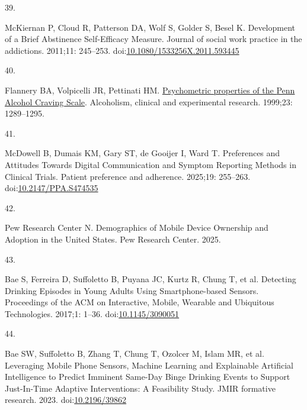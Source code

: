 \documentclass[
  letterpaper,
  DIV=11,
  numbers=noendperiod]{scrartcl}
\newlength{\cslhangindent}
\newlength{\csllabelwidth}
\newenvironment{CSLReferences}[2] %
 {\begin{list}{}{%
  \setlength{\itemindent}{0pt}
  \setlength{\leftmargin}{0pt}
  \setlength{\parsep}{0pt}
  \ifodd #1
   \setlength{\leftmargin}{\cslhangindent}
   \setlength{\itemindent}{-1\cslhangindent}
  \fi
  \setlength{\itemsep}{#2\baselineskip}}}
 {\end{list}}
\newcommand{\CSLLeftMargin}[1]{\parbox[t]{\csllabelwidth}{\strut#1\strut}}
\newcommand{\CSLRightInline}[1]{\parbox[t]{\linewidth - \csllabelwidth}{\strut#1\strut}}
\begin{document}
\begin{CSLReferences}{0}{1}
\CSLLeftMargin{39. }%
\CSLRightInline{McKiernan P, Cloud R, Patterson DA, Wolf S, Golder S,
Besel K. Development of a {Brief Abstinence Self-Efficacy Measure}.
Journal of social work practice in the addictions. 2011;11: 245--253.
doi:\href{https://doi.org/10.1080/1533256X.2011.593445}{10.1080/1533256X.2011.593445}}

\CSLLeftMargin{40. }%
\CSLRightInline{Flannery BA, Volpicelli JR, Pettinati HM.
\href{https://www.ncbi.nlm.nih.gov/pubmed/10470970}{Psychometric
properties of the {Penn Alcohol Craving Scale}}. Alcoholism, clinical
and experimental research. 1999;23: 1289--1295. }

\CSLLeftMargin{41. }%
\CSLRightInline{{McDowell B, Dumais KM, Gary ST, de Gooijer I, Ward T}.
Preferences and {Attitudes Towards Digital Communication} and {Symptom
Reporting Methods} in {Clinical Trials}. Patient preference and
adherence. 2025;19: 255--263.
doi:\href{https://doi.org/10.2147/PPA.S474535}{10.2147/PPA.S474535}}

\CSLLeftMargin{42. }%
\CSLRightInline{Pew Research Center N. Demographics of {Mobile Device
Ownership} and {Adoption} in the {United States}. Pew Research Center.
2025. }

\CSLLeftMargin{43. }%
\CSLRightInline{Bae S, Ferreira D, Suffoletto B, Puyana JC, Kurtz R,
Chung T, et al. Detecting {Drinking Episodes} in {Young Adults Using
Smartphone-based Sensors}. Proceedings of the ACM on Interactive,
Mobile, Wearable and Ubiquitous Technologies. 2017;1: 1--36.
doi:\href{https://doi.org/10.1145/3090051}{10.1145/3090051}}

\CSLLeftMargin{44. }%
\CSLRightInline{Bae SW, Suffoletto B, Zhang T, Chung T, Ozolcer M, Islam
MR, et al. Leveraging {Mobile Phone Sensors}, {Machine Learning} and
{Explainable Artificial Intelligence} to {Predict Imminent Same-Day
Binge Drinking Events} to {Support Just-In-Time Adaptive Interventions}:
{A Feasibility Study}. JMIR formative research. 2023.
doi:\href{https://doi.org/10.2196/39862}{10.2196/39862}}

\end{CSLReferences}
\end{document}
